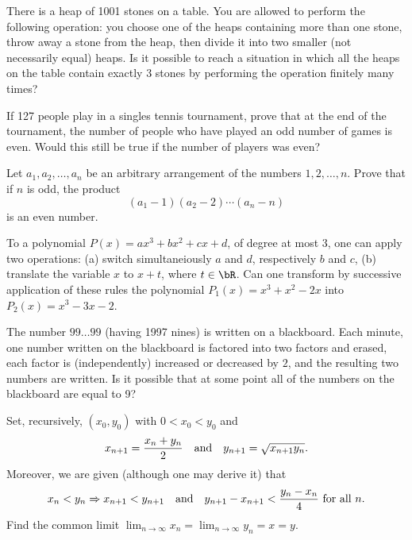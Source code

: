 \documentclass[12pt]{article}
\begin{document}
        \begin{exercise}
            There is a heap of 1001 stones on a table. You are allowed to perform the following operation: you choose one of the heaps containing more than one stone, throw away a stone from the heap, then divide it into two smaller (not necessarily equal) heaps. Is it possible to reach a situation in which all the heaps on the table contain exactly 3 stones by performing the operation finitely many times?
        \end{exercise}

        \begin{exercise}
            If 127 people play in a singles tennis tournament, prove that at the end of the tournament, the number of people who have played an odd number of games is even. Would this still be true if the number of players was even?
        \end{exercise}
    
        \begin{exercise}
            Let \(a_1,a_2,\ldots,a_n\) be an arbitrary arrangement of the numbers \(1,2,\ldots,n\). Prove that if \(n\) is odd, the product
            \[(a_1-1)(a_2-2)\cdots(a_n-n)\]
            is an even number.
        \end{exercise}
    
        \begin{exercise}
            To a polynomial \(P(x)=ax^3+bx^2+cx+d\), of degree at most 3, one can apply two operations: (a) switch simultaneiously \(a\) and \(d\), respectively \(b\) and \(c\), (b) translate the variable \(x\) to \(x+t\), where \(t\in\bR\). Can one transform by successive application of these rules the polynomial \(P_1(x)=x^3+x^2-2x\) into \(P_2(x)=x^3-3x-2\). 
        \end{exercise}
    
        \begin{exercise}
            The number \(99\ldots99\) (having 1997 nines) is written on a blackboard. Each minute, one number written on the blackboard is factored into two factors and erased, each factor is (independently) increased or decreased by \(2\), and the resulting two numbers are written. Is it possible that at some point all of the numbers on the blackboard are equal to 9?
        \end{exercise}

        \begin{exercise}
            Set, recursively, \((x_0,y_0)\) with \(0<x_0<y_0\) and
            \[x_{n+1}=\frac{x_n+y_n}{2}\quad\text{and}\quad y_{n+1}=\sqrt{x_{n+1}y_n}.\]
            Moreover, we are given (although one may derive it) that
            \[x_n<y_n\Rightarrow x_{n+1}<y_{n+1}\quad\text{and}\quad y_{n+1}-x_{n+1}<\frac{y_n-x_n}{4}\text{ for all }n.\]
            Find the common limit \(\displaystyle\lim_{n\to\infty}x_n=\lim_{n\to\infty}y_n=x=y\).
        \end{exercise}
    
\end{document}
